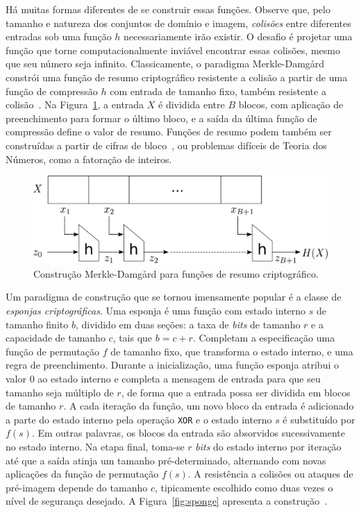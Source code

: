 Há muitas formas diferentes de se construir essas funções.
Observe que, pelo tamanho e natureza dos conjuntos de domínio e imagem, \emph{colisões} entre diferentes entradas sob uma função $h$ necessariamente irão existir. O desafio é projetar uma função que torne computacionalmente inviável encontrar essas colisões, mesmo que seu número seja infinito.
Classicamente, o paradigma Merkle-Damg\aa rd constrói uma função de resumo criptográfico resistente a colisão a partir de uma função de compressão $h$ com entrada de tamanho fixo, também resistente a colisão~\cite{Merkle79,Damgard89a}. Na Figura~\ref{fig:merkle}, a entrada $X$ é dividida entre $B$ blocos, com aplicação de preenchimento para formar o último bloco, e a saída da última função de compressão define o valor de resumo. Funções de resumo podem também ser construídas a partir de cifras de bloco~\cite{PreneelGV93}, ou problemas difíceis de Teoria dos Números, como a fatoração de inteiros.

\begin{figure}[htbp]
\begin{center}
    \includegraphics[scale=0.2]{figures/merkle.pdf}
    \caption{Construção Merkle-Damg\aa rd para funções de resumo criptográfico.}
    \label{fig:merkle}
\end{center}
\end{figure}

Um paradigma de construção que se tornou imensamente popular é a classe de \emph{esponjas criptográficas}. Uma esponja é uma função com estado interno $s$ de tamanho finito $b$, dividido em duas seções: a taxa de \emph{bits} de tamanho $r$ e a capacidade de tamanho $c$, tais que $b = c + r$. Completam a especificação uma função de permutação $f$ de tamanho fixo, que transforma o estado interno, e uma regra de preenchimento. Durante a inicialização, uma função esponja atribui o valor 0 ao estado interno e completa a mensagem de entrada para que seu tamanho seja múltiplo de $r$, de forma que a entrada possa ser dividida em blocos de tamanho $r$. A cada iteração da função, um novo bloco da entrada é adicionado a parte do estado interno pela operação \texttt{XOR} e o estado interno $s$ é substituído por $f(s)$. Em outras palavras, os blocos da entrada são absorvidos sucessivamente no estado interno. Na etapa final, toma-se $r$ \emph{bits} do estado interno por iteração até que a saída atinja um tamanho pré-determinado, alternando com novas aplicações da função de permutação $f(s)$. A resistência a colisões ou ataques de pré-imagem depende do tamanho $c$, tipicamente escolhido como duas vezes o nível de segurança desejado. A Figura~\ref{fig:sponge} apresenta a construção~\cite{BertoniDPA08}.

